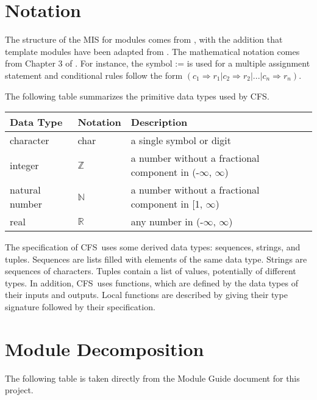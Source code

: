 \documentclass[12pt, titlepage]{article}
\newcommand{\progname}{CFS}
\begin{document}
\section{Notation}

The structure of the MIS for modules comes from \citet{HoffmanAndStrooper1995},
with the addition that template modules have been adapted from
\cite{GhezziEtAl2003}. The mathematical notation comes from Chapter 3 of
\citet{HoffmanAndStrooper1995}.  For instance, the symbol := is used for a
multiple assignment statement and conditional rules follow the form $(c_1
\Rightarrow r_1 | c_2 \Rightarrow r_2 | ... | c_n \Rightarrow r_n )$.



The following table summarizes the primitive data types used by \progname. 

\begin{center}
\renewcommand{\arraystretch}{1.2}
\noindent 
\begin{tabular}{l l p{7.5cm}} 
\toprule 
\textbf{Data Type} & \textbf{Notation} & \textbf{Description}\\ 
\midrule
character & char & a single symbol or digit\\
integer & $\mathbb{Z}$ & a number without a fractional component in (-$\infty$, $\infty$) \\
natural number & $\mathbb{N}$ & a number without a fractional component in [1, $\infty$) \\
real & $\mathbb{R}$ & any number in (-$\infty$, $\infty$)\\
\bottomrule
\end{tabular} 
\end{center}

\noindent
The specification of \progname \ uses some derived data types: sequences, strings, and
tuples. Sequences are lists filled with elements of the same data type. Strings
are sequences of characters. Tuples contain a list of values, potentially of
different types. In addition, \progname \ uses functions, which
are defined by the data types of their inputs and outputs. Local functions are
described by giving their type signature followed by their specification.

\section{Module Decomposition}
The following table is taken directly from the Module Guide document for this project.
\end{document}
